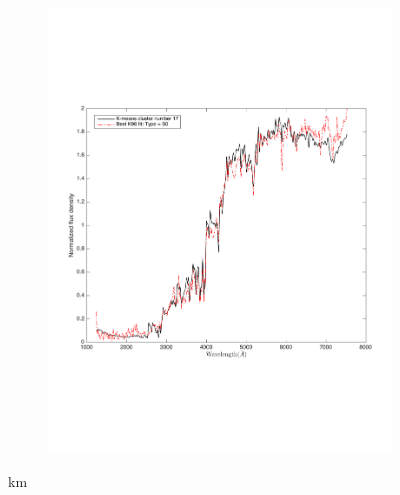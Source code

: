 \begin{figure}
\begin{subfigure}[b]{0.49\textwidth}
                    \centering \includegraphics[width=.99\textwidth]{k_means_images/min_cosine2.pdf}
                \end{subfigure}
                \caption{km}
                 \label{fig: k_means_minmax}
\end{figure}



